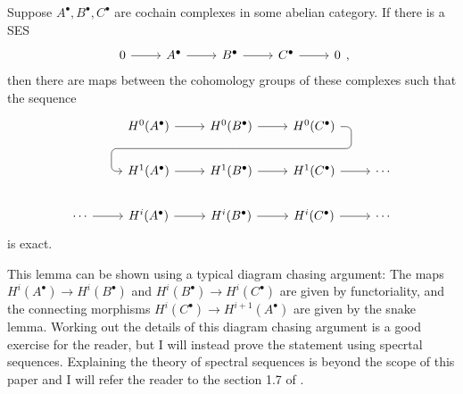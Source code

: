\begin{lemm} %
  Suppose $A^{\bullet},B^{\bullet},C^{\bullet}$ are cochain complexes in some
  abelian category. If there is a SES
  \[\begin{tikzcd}
      0\rar & A^{\bullet}\rar & B^{\bullet}\rar & C^{\bullet}\rar & 0
    \end{tikzcd},\]
  then there are maps between the cohomology groups of these complexes
  such that the sequence
  \[\begin{tikzcd}
    & H^{0}(A^{\bullet}) \rar & H^{0}(B^{\bullet})
    \rar\dar[phantom, ""{coordinate, name=Z}] & H^{0}(C^{\bullet})
    \arrow[rounded corners, to path={ -- ([xshift=2ex]\tikztostart.east)
      |- (Z) -| ([xshift=-2ex]\tikztotarget.west) -- (\tikztotarget)},
    overlay]{dll} & \\
    & H^{1}(A^{\bullet}) \rar & H^{1}(B^{\bullet})\rar
    & H^{1}(C^{\bullet}) \rar & \cdots \\
    \cdots \rar& H^{i}(A^{\bullet}) \rar & H^{i}(B^{\bullet})\rar
    & H^{i}(C^{\bullet}) \rar & \cdots
    \end{tikzcd}\]
  is exact.
\end{lemm}
This lemma can be shown using a typical diagram chasing argument: The maps
$H^{i}(A^{\bullet})\to H^{i}(B^{\bullet})$ and
$H^{i}(B^{\bullet})\to H^{i}(C^{\bullet})$ are given by functoriality, and the
connecting morphisms $H^{i}(C^{\bullet})\to H^{i+1}(A^{\bullet})$ are given by
the snake lemma. Working out the details of this diagram chasing argument is
a good exercise for the reader, but I will instead prove the statement using
specrtal sequences. Explaining the theory of spectral sequences is beyond
the scope of this paper and I will refer the reader to the section 1.7 of
\cite{vakil}.
